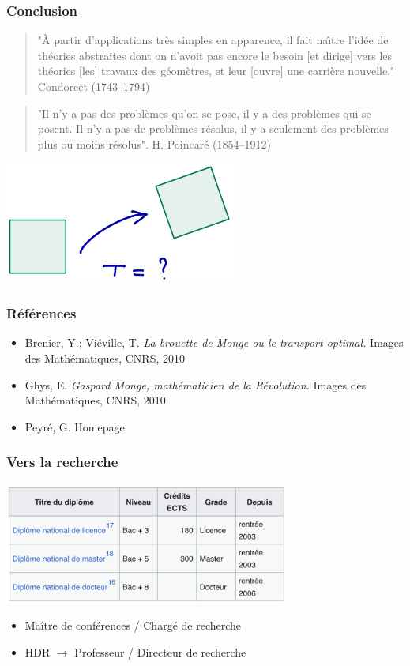 \documentclass[9pt]{beamer}
\begin{document}
\begin{frame}
\frametitle{\bf Conclusion}

\begin{quote}
"\`A partir d'applications tr\`es simples en apparence, il fait na\^\i tre l'id\'ee de th\'eories abstraites dont on n'avoit pas encore le besoin [et dirige] vers les th\'eories [les] travaux des g\'eom\`etres, et leur [ouvre] une carri\`ere nouvelle." Condorcet (1743--1794)
\end{quote}
 
\begin{quote}
"Il n'y a pas des probl\`emes qu'on se pose, il y a des probl\`emes qui se posent. Il n'y a pas de probl\`emes r\'esolus, il y a seulement des probl\`emes plus ou moins r\'esolus". H. Poincar\'e (1854--1912)
\end{quote}

\centering \includegraphics[height=4.0cm]{carre}

\end{frame}

\begin{frame}
\frametitle{\bf R\'ef\'erences}
 
\begin{itemize}
  \item Brenier, Y.; Vi\'eville, T. \emph{La brouette de Monge ou le transport optimal.} Images des Math\'ematiques, CNRS, 2010
  \item Ghys, E. \emph{Gaspard Monge, math\'ematicien de la R\'evolution.} Images des Math\'ematiques, CNRS, 2010
  \item Peyr\'e, G. Homepage
\end{itemize}

\end{frame}

\begin{frame}
\frametitle{\bf Vers la recherche}

\centering \includegraphics[height=4.0cm]{lmd}
 
\begin{itemize}
  \item Ma\^itre de conf\'erences / Charg\'e de recherche 
  \item HDR $\rightarrow$ Professeur / Directeur de recherche
\end{itemize}

\end{frame}
\end{document}
